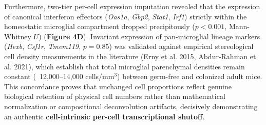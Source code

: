\documentclass[10pt,a4paper]{article}
\begin{document}
Furthermore, two-tier per-cell expression imputation revealed that the expression of canonical interferon effectors (\textit{Oas1a}, \textit{Gbp2}, \textit{Stat1}, \textit{Irf1}) strictly within the homeostatic microglial compartment dropped precipitously ($p < 0.001$, Mann-Whitney $U$) (\textbf{Figure 4D}). Invariant expression of pan-microglial lineage markers (\textit{Hexb}, \textit{Csf1r}, \textit{Tmem119}, $p = 0.85$) was validated against empirical stereological cell density measurements in the literature (Erny et al. 2015, Abdur-Rahman et al. 2021)\cite{erny2015_6,abdurrahman2021_23}, which establish that total microglial parenchymal densities remain constant (~12,000--14,000 cells/$\text{mm}^3$) between germ-free and colonized adult mice. This concordance proves that unchanged cell proportions reflect genuine biological retention of physical cell numbers rather than mathematical normalization or compositional deconvolution artifacts, decisively demonstrating an authentic \textbf{cell-intrinsic per-cell transcriptional shutoff}.
\end{document}

